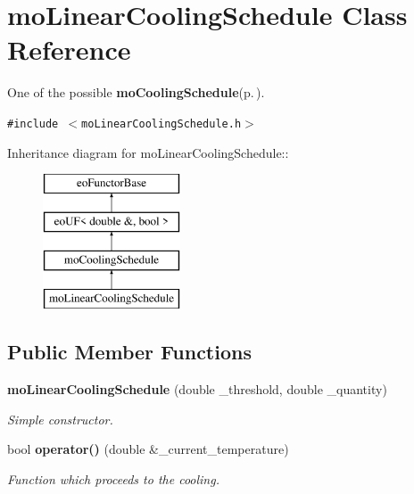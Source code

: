 \section{mo\-Linear\-Cooling\-Schedule Class Reference}
\label{classmo_linear_cooling_schedule}
One of the possible {\bf mo\-Cooling\-Schedule}{\rm (p.\,\pageref{classmo_cooling_schedule})}.  


{\tt \#include $<$mo\-Linear\-Cooling\-Schedule.h$>$}

Inheritance diagram for mo\-Linear\-Cooling\-Schedule::\begin{figure}[H]
\begin{center}
\leavevmode
\includegraphics[height=4cm]{classmo_linear_cooling_schedule}
\end{center}
\end{figure}
\subsection*{Public Member Functions}
\begin{CompactItemize}
\item 
{\bf mo\-Linear\-Cooling\-Schedule} (double \_\-threshold, double \_\-quantity)
\begin{CompactList}\small\item\em Simple constructor. \item\end{CompactList}\item 
bool {\bf operator()} (double \&\_\-current\_\-temperature)
\begin{CompactList}\small\item\em Function which proceeds to the cooling. \item\end{CompactList}\end{CompactItemize}
